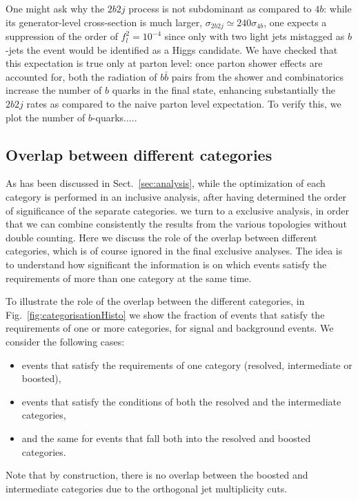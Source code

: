   One might ask why the $2b2j$ process
  is not subdominant as compared to $4b$: while its generator-level cross-section is
  much larger, $\sigma_{2b2j} \simeq 240\sigma_{4b}$, one expects a suppression
  of the order of $f_l^2 =10^{-4}$ since only with two light jets mistagged as $b$-jets the event
  would be identified as a Higgs candidate.
  We have checked that this expectation is true only at parton level: once parton shower effects
  are accounted for, both the radiation of $b\bar{b}$ pairs from the shower and combinatorics increase
  the number of $b$ quarks in the final state, enhancing substantially the $2b2j$ rates as compared
  to the naive parton level expectation.
  To verify this, we plot the number of $b$-quarks.....



  \subsection{Overlap between different categories}
\label{sec:overlap}

As has been discussed in Sect.~\ref{sec:analysis}, while the optimization of each
category is performed in an inclusive analysis, after having determined the order
of significance of the separate categories. we turn to a exclusive analysis,
in order that
we can combine consistently the results from the various topologies without double
counting.
%
Here we discuss the role of the overlap
between  different categories, which is of course ignored in the final exclusive
analyses.
%
The idea is to understand how significant the information is on which events satisfy the requirements
of more than one category at the same time.

To illustrate the role of the overlap between the different categories, in
Fig.~\ref{fig:categorisationHisto} we show the fraction of events that satisfy the requirements
of one or more categories, for signal and background events.
%
We consider the following cases:
\begin{itemize}
\item events that satisfy the requirements of one category (resolved,
  intermediate or boosted),
\item events that satisfy the conditions of both the resolved and the intermediate categories,
\item and the same for events that fall both
  into the resolved and boosted categories.
\end{itemize}
 Note that by construction, there is no overlap between the boosted
  and intermediate categories due to the
 orthogonal jet multiplicity cuts.


